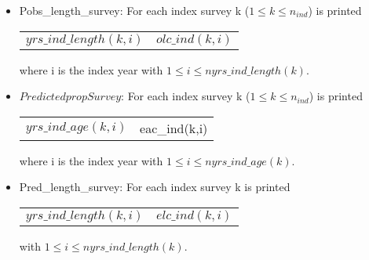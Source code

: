 \documentclass{article}
\begin{document}
\begin{itemize}
    \item Pobs\_length\_survey:  For each index survey k ($1\leq k \leq n_{ind}$) is printed
    \begin{center}
        \begin{tabular}{c c}
           $yrs\_ind\_length(k,i)$  & $olc\_ind(k,i)$ \\
        \end{tabular}
    \end{center}
    where i is the index year with $1\leq i \leq nyrs\_ind\_length(k)$.

    \item $Predicted prop Survey$: For each index survey k ($1\leq k \leq n_{ind}$) is printed
    \begin{center}
        \begin{tabular}{c c}
           $yrs\_ind\_age(k,i)$  & eac\_ind(k,i) \\
        \end{tabular}
    \end{center}
where i is the index year with $1\leq i \leq nyrs\_ind\_age(k)$.

    \item Pred\_length\_survey: For each index survey k is printed 
    \begin{center}
        \begin{tabular}{c c}
           $yrs\_ind\_length(k,i)$  &  $elc\_ind(k,i)$\\
        \end{tabular}
    \end{center}
    with $1\leq i \leq nyrs\_ind\_length(k)$.


\end{itemize}
\end{document}
